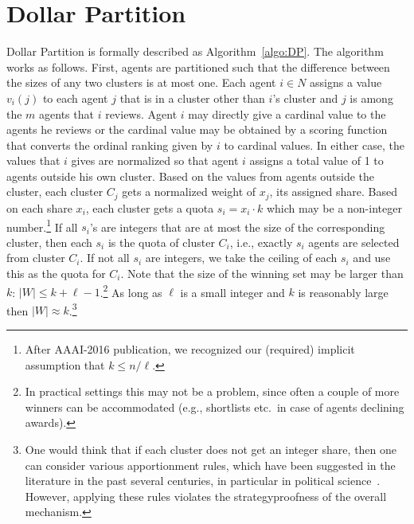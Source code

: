 \documentclass[letterpaper]{article}
\newcommand{\haris}[1]{\textcolor{green}{\textbf{Haris Says: #1}}}
\begin{document}
	
\section{Dollar Partition}

	

Dollar Partition is formally described as Algorithm~\ref{algo:DP}. The algorithm works as follows. First, agents are partitioned such that the difference between the sizes of any two clusters is at most one. Each agent $i\in N$ assigns a value $v_i(j)$ to each agent $j$ that is in a cluster other than $i$'s cluster and $j$ is among the $m$ agents that $i$ reviews. Agent $i$ may directly give a cardinal value to the agents he reviews or the cardinal value may be obtained by a scoring function that converts the ordinal ranking given by $i$ to cardinal values. In either case, the values that $i$ gives are normalized so that agent $i$ assigns a total value of 1 to agents outside his own cluster. Based on the values from agents outside the cluster, each cluster $C_j$ gets a normalized weight of $x_j$, its assigned share. Based on each share $x_i$, each cluster gets a quota $s_i=x_i \cdot k$ which may be a non-integer number.\footnote{After AAAI-2016 publication, we recognized our (required) implicit assumption that $k \leq n/\ell$.}
	If all $s_i$'s are integers that are at most the size of the corresponding cluster, then each $s_i$ is the quota of cluster $C_i$, i.e., exactly $s_i$ agents are selected from cluster $C_i$. 
If not all $s_i$ are integers, we take the ceiling of each $s_i$ and use this as the quota for $C_i$.
Note that the size of the winning set may be larger than $k$: $|W| \leq k+\ell-1$.\footnote{In practical settings this may not be a problem, since often a couple of more winners can be accommodated (e.g., shortlists etc.\ in case of agents declining awards).}
As long as $\ell$ is a small integer and $k$ is reasonably large then $|W| \approx k$.\footnote{One would think that if each cluster does not get an integer share, then one can consider various apportionment rules, which have been suggested in the literature in the past several centuries, in particular in political science~\cite{Youn94a}. However, applying these rules violates the strategyproofness of the overall mechanism.}
	
\end{document}

